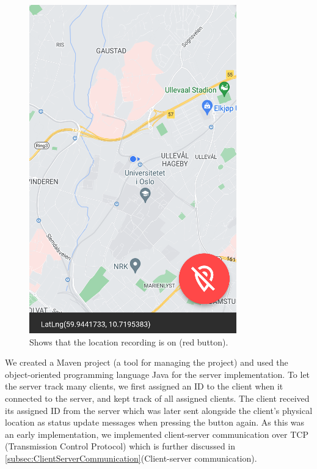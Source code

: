 \documentclass{article}
\begin{document}
\begin{figure}[H]
\begin{minipage}[c]{0.34\linewidth}
        \includegraphics[width=\linewidth]{graphics/recording_on.png}
        \caption{Shows that the location recording is on (red button).}
        \label{fig:recording_on}
    \end{minipage}
\end{figure}

We created a Maven project (a tool for managing the project) and used the object-oriented programming language Java for the server implementation. To let the server track many clients, we first assigned an ID to the client when it connected to the server, and kept track of all assigned clients. The client received its assigned ID from the server which was later sent alongside the client's physical location as status update messages when pressing the button again. As this was an early implementation, we implemented client-server communication over TCP (Transmission Control Protocol) which is further discussed in \ref{subsec:ClientServerCommunication}(Client-server communication).
\end{document}
